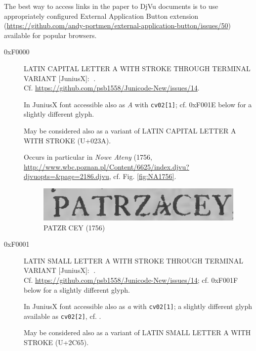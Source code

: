 \documentclass{article}
\newcommand{\Jglyph}[1]{{\relsize{2}\J#1}}
\begin{document}
The best way to access links in the paper to DjVu documents is to use
appropriately configured External Application Button extension
(\url{https://github.com/andy-portmen/external-application-button/issues/50})
available for popular browsers.

\begin{description}
\item[0xF0000] LATIN CAPITAL LETTER A WITH STROKE THROUGH TERMINAL
  VARIANT [JuniusX]: \Jglyph{󰀀}.\\
  Cf. \url{https://github.com/psb1558/Junicode-New/issues/14}.
  
  In JuniusX font accessible also as \textit{A} with \texttt{cv02[1]};
  cf.  0xF001E  below for a slightly different glyph.

  May be considered also as a variant of LATIN CAPITAL LETTER A WITH
  STROKE (U+023A).

  Occurs in particular in \textit{Nowe Ateny} (1756,
  \url{http://www.wbc.poznan.pl/Content/6625/index.djvu?djvuopts=&page=2186.djvu},
  cf. Fig. \vref{fig:NA1756}.

  \begin{figure}[h]
    \includegraphics{img/00433085patrzacey}
    \caption{{\J PATZR󰀂CEY} (1756)}
    \label{fig:NA1756}
  \end{figure}

\item [0xF0001] LATIN SMALL LETTER A WITH STROKE THROUGH TERMINAL VARIANT [JuniusX]: 
  \Jglyph{󰀁}.\\ Cf. \url{https://github.com/psb1558/Junicode-New/issues/14};
  cf. 0xF001F below for a slightly different glyph.

  In JuniusX font accessible also as \textit{a} with \texttt{cv02[1]};
  a slightly different glyph available as \texttt{cv02[2]},
  cf. \autocite[p. 7]{baker20:_opent_featur_junius_junius}.


  May be considered also as a variant of LATIN SMALL LETTER A WITH
  STROKE (U+2C65).


\end{description}
\end{document}
